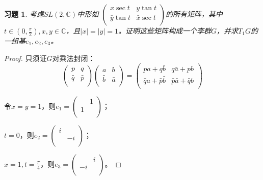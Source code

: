 \documentclass[winfonts,UTF8,c5size,a4paper,fancyhdr,hyperref,titlepage,nocap]{ctexart}
\newtheorem{xiti}{习题}
\theoremstyle{definition}
\theoremstyle{remark}
\numberwithin{equation}{subsection}
\newcommand{\Complex}{\mathbb{C}}
\begin{document}
\begin{xiti}
  考虑$SL(2,\Complex)$中形如
  $\begin{pmatrix}
     x\sec t & y\tan t \\
     \bar{y}\tan t & \bar{x}\sec t \\
   \end{pmatrix}
  $的所有矩阵，其中$t\in(0,\frac{\pi}{2}), x,y\in\Complex$，且$|x|=|y|=1$。证明这些矩阵构成一个李群$G$，并求$T_1G$的一组基$e_1,e_2,e_3$。
\end{xiti}
\begin{proof}
  只须证$G$对乘法封闭：
  \begin{equation*}
   \begin{pmatrix}
     p & q \\
     \bar{q} & \bar{p} \\
   \end{pmatrix}
   \begin{pmatrix}
     a & b \\
     \bar{b} & \bar{a} \\
   \end{pmatrix}
   =\begin{pmatrix}
     pa+q\bar{b} & q\bar{a}+pb \\
     \bar{q}a+\bar{p}\bar{b} & \bar{p}\bar{a}+\bar{q}b \\
   \end{pmatrix}
  \end{equation*}

  令$x=y=1$，则$e_1=
  \begin{pmatrix}
     & 1 \\
    1 &  \\
  \end{pmatrix}
  $；

  $t=0$，则$e_2=
  \begin{pmatrix}
    i &  \\
     & -i \\
  \end{pmatrix}
  $；

  $x=1,t=\frac{\pi}{4}$，则$e_3=
  \begin{pmatrix}
     & i \\
    -i &  \\
  \end{pmatrix}
  $。
\end{proof}
\end{document}
